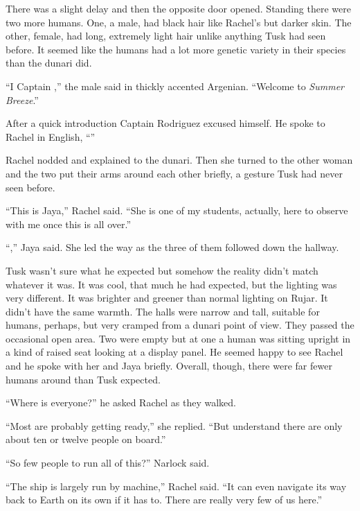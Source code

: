 There was a slight delay and then the opposite door opened. Standing there were two more humans.
One, a male, had black hair like Rachel's but darker skin. The other, female, had long,
extremely light hair unlike anything Tusk had seen before. It seemed like the humans had a lot
more genetic variety in their species than the dunari did.

``I Captain ,'' the male said in thickly accented Argenian. ``Welcome to
\textit{Summer Breeze}.''

\breakpoint

After a quick introduction Captain Rodriguez excused himself. He spoke to Rachel in English,
``''

Rachel nodded and explained to the dunari. Then she turned to the other woman and the two put
their arms around each other briefly, a gesture Tusk had never seen before.

``This is Jaya,'' Rachel said. ``She is one of my students, actually, here to observe with me
once this is all over.''

``,'' Jaya said. She led the way as the three of them followed
down the hallway.

Tusk wasn't sure what he expected but somehow the reality didn't match whatever it was. It was
cool, that much he had expected, but the lighting was very different. It was brighter and
greener than normal lighting on Rujar. It didn't have the same warmth. The halls were narrow and
tall, suitable for humans, perhaps, but very cramped from a dunari point of view. They passed
the occasional open area. Two were empty but at one a human was sitting upright in a kind of
raised seat looking at a display panel. He seemed happy to see Rachel and he spoke with her and
Jaya briefly. Overall, though, there were far fewer humans around than Tusk expected.

``Where is everyone?'' he asked Rachel as they walked.

``Most are probably getting ready,'' she replied. ``But understand there are only about ten or
twelve people on board.''

``So few people to run all of this?'' Narlock said.

``The ship is largely run by machine,'' Rachel said. ``It can even navigate its way back to
Earth on its own if it has to. There are really very few of us here.''


